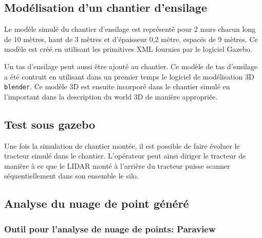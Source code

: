 \documentclass[12pt,a4paper]{report}
\begin{document}
		\subsection{Modélisation d'un chantier d'ensilage}
		Le modèle simulé du chantier d'ensilage est représenté pour 2 murs chacun long de 10 mètres, haut de 3 mètres et d'épaisseur 0,2 mètre, espacés de 9 mètres. Ce modèle est créé en utilisant les primitives XML fournies par le logiciel Gazebo.
		
		
		\para Un tas d'ensilage peut aussi être ajouté au chantier. Ce modèle de tas d'ensilage a été contruit en utilisant dans un premier temps le logiciel de modélisation 3D \verb|blender|. Ce modèle 3D est ensuite incorporé dans le chantier simulé en l'important dans la description du world 3D de manière appropriée.
		
		
	
	
		\subsection{Test sous gazebo}
		Une fois la simulation de chantier montée, il est possible de faire évoluer le tracteur simulé dans le chantier. L'opérateur peut ainsi diriger le tracteur de manière à ce que le LIDAR monté à l'arrière du tracteur puisse scanner séquentiellement dans son ensemble le silo.
		

		
		\subsection{Analyse du nuage de point généré}
		\subsubsection{Outil pour l'analyse de nuage de points: Paraview}
		
\end{document}

